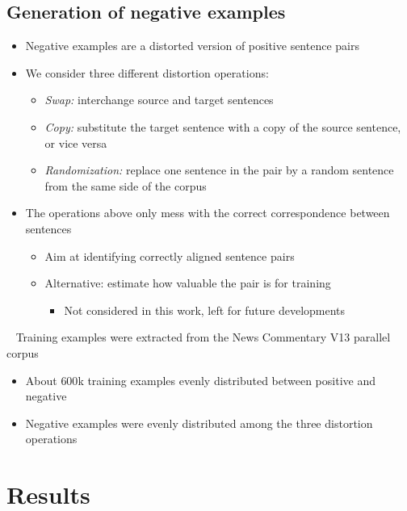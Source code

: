 \documentclass[a0]{sciposter}
\begin{document}
\begin{multicols*}{2}
\subsection*{Generation of negative examples}
\begin{itemize}
  \item Negative examples are a distorted version of positive sentence pairs~\cite{Hainan17}
  \item We consider three different distortion operations:
  \begin{itemize}
  \item \textit{Swap:} interchange source and target sentences
  \item \textit{Copy:} substitute the target sentence with a copy of the source sentence, or vice versa
  \item \textit{Randomization:} replace one sentence in the pair by a random sentence from the same side of the corpus
  \end{itemize}
  \item The operations above only mess with the correct correspondence between sentences
  \begin{itemize}
    \item Aim at identifying correctly aligned sentence pairs
    \item Alternative: estimate how valuable the pair is for training
    \begin{itemize}
      \item Not considered in this work, left for future developments
    \end{itemize}
  \end{itemize}
\end{itemize}

~\newline
Training examples were extracted from the News Commentary V13 parallel corpus
\begin{itemize}
  \item About $600$k training examples evenly distributed between positive and negative
  \item Negative examples were evenly distributed among the three distortion operations
\end{itemize}





\section*{\Large Results}


\end{multicols*}
\end{document}

